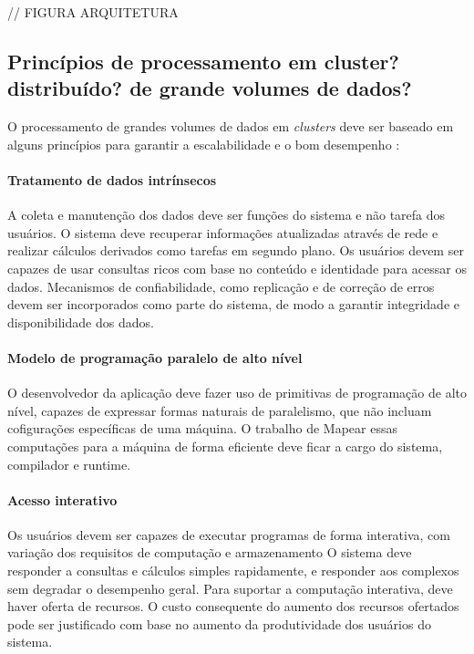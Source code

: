 // FIGURA ARQUITETURA

\subsection{ Princípios de processamento em cluster? distribuído? de grande volumes de dados? }

O processamento de grandes volumes de dados em \textit{clusters} deve ser baseado em alguns princípios para garantir a escalabilidade e o bom desempenho \cite{Bryant:2011}:



\paragraph{Tratamento de dados intrínsecos}
A coleta e manutenção dos dados deve ser funções do sistema e não tarefa dos usuários.  
O sistema deve recuperar informações atualizadas através de rede e realizar cálculos derivados como tarefas em segundo plano. Os usuários devem ser capazes de usar consultas ricos com base no conteúdo e identidade para acessar os dados. 
Mecanismos de confiabilidade, como replicação e de correção de erros devem ser incorporados como parte do sistema, de modo a garantir integridade e disponibilidade dos dados.

\paragraph{Modelo de programação paralelo de alto nível}
O desenvolvedor da aplicação deve fazer uso de primitivas de programação de alto nível, capazes de expressar formas naturais de paralelismo, que não incluam cofigurações específicas de uma máquina. O trabalho de Mapear essas computações para a máquina de forma eficiente deve ficar a cargo do sistema, compilador e runtime.

\paragraph{Acesso interativo} 
Os usuários devem ser capazes de executar programas de forma interativa, com variação dos requisitos de computação e armazenamento O sistema deve responder a consultas e cálculos simples rapidamente, e responder aos complexos sem degradar o desempenho geral. Para suportar a computação interativa, deve haver oferta de recursos. O custo consequente do aumento dos recursos ofertados pode ser justificado com base no aumento da produtividade dos usuários do sistema.


